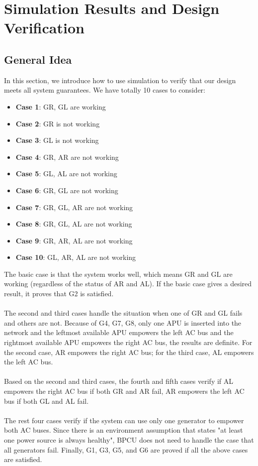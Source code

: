 \documentclass{mcmthesis}
\begin{document}
\section{Simulation Results and Design Verification}

\subsection{General Idea}
In this section, we introduce how to use simulation to verify that our design meets all system guarantees. We have totally 10 cases to consider:
\begin{itemize}
\item \textbf{Case 1}: GR, GL are working 
\item \textbf{Case 2}: GR is not working
\item \textbf{Case 3}: GL is not working
\item \textbf{Case 4}: GR, AR are not working
\item \textbf{Case 5}: GL, AL are not working
\item \textbf{Case 6}: GR, GL are not working 
\item \textbf{Case 7}: GR, GL, AR are not working 
\item \textbf{Case 8}: GR, GL, AL are not working 
\item \textbf{Case 9}: GR, AR, AL are not working 
\item \textbf{Case 10}: GL, AR, AL are not working 
\end{itemize}
The basic case is that the system works well, which means GR and GL are working (regardless of the status of AR and AL). If the basic case gives a desired result, it proves that G2 is satisfied.  
\\
\\
The second and third cases handle the situation when one of GR and GL fails and others are not. Because of G4, G7, G8, only one APU is inserted into the network and the leftmost available APU empowers the left AC bus and the rightmost available APU empowers the right AC bus, the results are definite. For the second case, AR empowers the right AC bus; for the third case, AL empowers the left AC bus.
\\
\\
Based on the second and third cases, the fourth and fifth cases verify if AL empowers the right AC bus if both GR and AR fail, AR empowers the left AC bus if both GL and AL fail.
\\
\\
The rest four cases verify if the system can use only one generator to empower both AC buses. Since there is an environment assumption that states "at least one power source is always healthy", BPCU does not need to handle the case that all generators fail. Finally, G1,  G3, G5, and G6 are proved if all the above cases are satisfied.
\pagebreak
\end{document}
